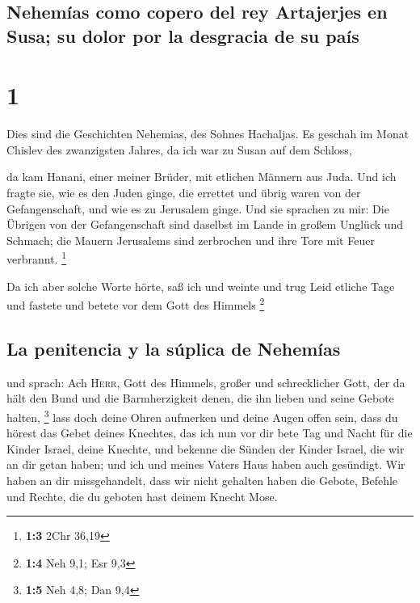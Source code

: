 \hypertarget{nehemuxedas-como-copero-del-rey-artajerjes-en-susa-su-dolor-por-la-desgracia-de-su-pauxeds}{%
\subsection{Nehemías como copero del rey Artajerjes en Susa; su dolor
por la desgracia de su
país}\label{nehemuxedas-como-copero-del-rey-artajerjes-en-susa-su-dolor-por-la-desgracia-de-su-pauxeds}}

\hypertarget{section}{%
\section{1}\label{section}}

 Dies sind die Geschichten Nehemias, des Sohnes Hachaljas.
Es geschah im Monat Chislev des zwanzigsten Jahres, da ich war zu Susan
auf dem Schloss,

 da kam Hanani, einer meiner Brüder, mit etlichen Männern
aus Juda. Und ich fragte sie, wie es den Juden ginge, die errettet und
übrig waren von der Gefangenschaft, und wie es zu Jerusalem ginge.
 Und sie sprachen zu mir: Die Übrigen von der
Gefangenschaft sind daselbst im Lande in großem Unglück und Schmach; die
Mauern Jerusalems sind zerbrochen und ihre Tore mit Feuer verbrannt.
\footnote{\textbf{1:3} 2Chr 36,19}

 Da ich aber solche Worte hörte, saß ich und weinte und
trug Leid etliche Tage und fastete und betete vor dem Gott des Himmels
\footnote{\textbf{1:4} Neh 9,1; Esr 9,3}

\hypertarget{la-penitencia-y-la-suxfaplica-de-nehemuxedas}{%
\subsection{La penitencia y la súplica de
Nehemías}\label{la-penitencia-y-la-suxfaplica-de-nehemuxedas}}

 und sprach: Ach \textsc{Herr}, Gott des Himmels, großer
und schrecklicher Gott, der da hält den Bund und die Barmherzigkeit
denen, die ihn lieben und seine Gebote halten, \footnote{\textbf{1:5}
  Neh 4,8; Dan 9,4}  lass doch deine Ohren aufmerken und
deine Augen offen sein, dass du hörest das Gebet deines Knechtes, das
ich nun vor dir bete Tag und Nacht für die Kinder Israel, deine Knechte,
und bekenne die Sünden der Kinder Israel, die wir an dir getan haben;
und ich und meines Vaters Haus haben auch gesündigt.  Wir
haben an dir missgehandelt, dass wir nicht gehalten haben die Gebote,
Befehle und Rechte, die du geboten hast deinem Knecht Mose.

